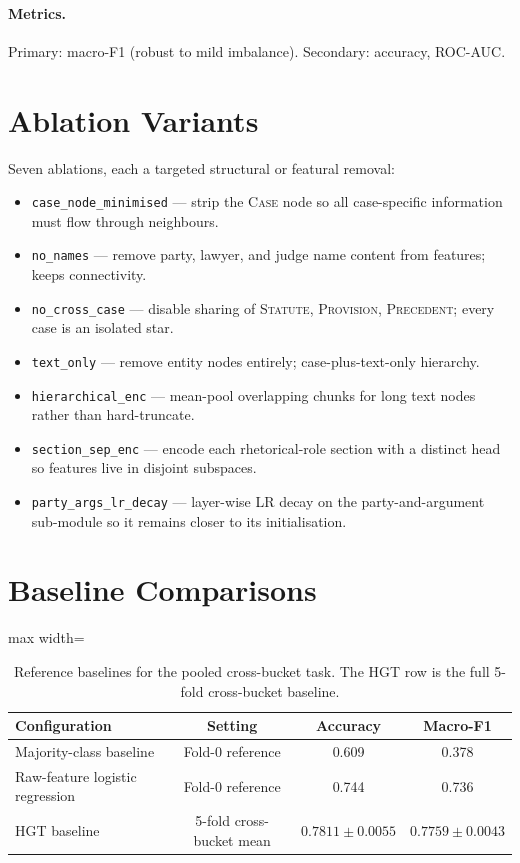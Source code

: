 \paragraph{Metrics.} Primary: macro-F1 (robust to mild imbalance). Secondary: accuracy, ROC-AUC.

\section{Ablation Variants}

Seven ablations, each a targeted structural or featural removal:

\begin{itemize}
  \item \texttt{case\_node\_minimised} --- strip the \textsc{Case} node so all case-specific information must flow through neighbours.
  \item \texttt{no\_names} --- remove party, lawyer, and judge name content from features; keeps connectivity.
  \item \texttt{no\_cross\_case} --- disable sharing of \textsc{Statute}, \textsc{Provision}, \textsc{Precedent}; every case is an isolated star.
  \item \texttt{text\_only} --- remove entity nodes entirely; case-plus-text-only hierarchy.
  \item \texttt{hierarchical\_enc} --- mean-pool overlapping chunks for long text nodes rather than hard-truncate.
  \item \texttt{section\_sep\_enc} --- encode each rhetorical-role section with a distinct head so features live in disjoint subspaces.
  \item \texttt{party\_args\_lr\_decay} --- layer-wise LR decay on the party-and-argument sub-module so it remains closer to its initialisation.
\end{itemize}

\section{Baseline Comparisons}

\begin{table}[H]
  \centering
  \small
  \begin{adjustbox}{max width=\textwidth}
  \begin{tabular}{lccc}
    \toprule
    Configuration & Setting & Accuracy & Macro-F1 \\
    \midrule
    Majority-class baseline & Fold-0 reference & 0.609 & 0.378 \\
    Raw-feature logistic regression & Fold-0 reference & 0.744 & 0.736 \\
    HGT baseline & 5-fold cross-bucket mean & $0.7811\pm0.0055$ & $0.7759\pm0.0043$ \\
    \bottomrule
  \end{tabular}
  \end{adjustbox}
  \caption{Reference baselines for the pooled cross-bucket task. The HGT row is the full 5-fold cross-bucket baseline.}
  \label{tab:baseline_references}
\end{table}


